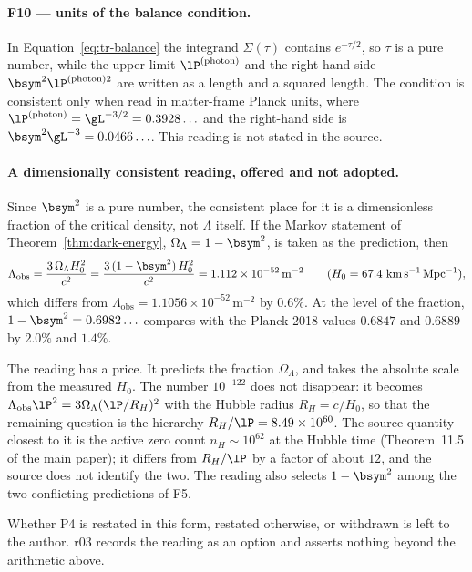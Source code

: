 \paragraph{F10 --- units of the balance condition.}
In Equation~\eqref{eq:tr-balance} the integrand \(\Sigma(\tau)\) contains \(e^{-\tau/2}\), so
\(\tau\) is a pure number, while the upper limit \(\lP^{(\mathrm{photon})}\) and the right-hand
side \(\bsym^2\lP^{(\mathrm{photon})2}\) are written as a length and a squared length.  The
condition is consistent only when read in matter-frame Planck units, where
\(\lP^{(\mathrm{photon})}=\gL^{-3/2}=0.3928\ldots\) and the right-hand side is
\(\bsym^2\gL^{-3}=0.0466\ldots\).  This reading is not stated in the source.

\paragraph{A dimensionally consistent reading, offered and not adopted.}
Since \(\bsym^2\) is a pure number, the consistent place for it is a dimensionless fraction of
the critical density, not \(\Lambda\) itself.  If the Markov statement of
Theorem~\ref{thm:dark-energy}, \(\Omega_\Lambda=1-\bsym^2\), is taken as the prediction, then
\[
\Lambda_{\mathrm{obs}}=\frac{3\,\Omega_\Lambda H_0^2}{c^2}
=\frac{3\,(1-\bsym^2)\,H_0^2}{c^2}
=1.112\times10^{-52}\,\mathrm{m}^{-2}
\qquad(H_0=67.4\ \mathrm{km\,s^{-1}\,Mpc^{-1}}),
\]
which differs from \(\Lambda_{\mathrm{obs}}=1.1056\times10^{-52}\,\mathrm{m}^{-2}\) by \(0.6\%\).
At the level of the fraction, \(1-\bsym^2=0.6982\ldots\) compares with the Planck 2018 values
\(0.6847\) and \(0.6889\) by \(2.0\%\) and \(1.4\%\).

The reading has a price.  It predicts the fraction \(\Omega_\Lambda\), and takes the absolute scale
from the measured \(H_0\).  The number \(10^{-122}\) does not disappear: it becomes
\(\Lambda_{\mathrm{obs}}\lP^2=3\Omega_\Lambda(\lP/R_H)^2\) with the Hubble radius \(R_H=c/H_0\), so
that the remaining question is the hierarchy \(R_H/\lP=8.49\times10^{60}\).  The source
quantity closest to it is the active zero count \(n_H\sim10^{62}\) at the Hubble time
(Theorem~11.5 of the main paper); it differs from \(R_H/\lP\) by a factor of about \(12\), and the
source does not identify the two.  The reading also selects \(1-\bsym^2\) among the two
conflicting predictions of F5.

Whether P4 is restated in this form, restated otherwise, or withdrawn is left to the author.
r03 records the reading as an option and asserts nothing beyond the arithmetic above.

